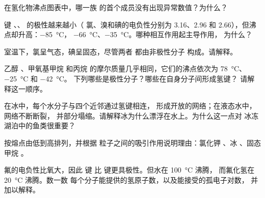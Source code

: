 \begin{exercise}[$\star\star$]\label{exo:g11:polarity-and-cohesion:9}
在氢化物沸点图表中，哪一族
的首个成员没有出现异常数值？为什么？
\end{exercise}

\begin{exercise}[$\star\star$]\label{exo:g11:polarity-and-cohesion:10}
键 、、 的极性越来越小（
氯、溴和碘的电负性分别为 3.16、2.96
和 2.66），但沸点却升高：\qty{-85}{\celsius}，
\qty{-66}{\celsius}、\qty{-35}{\celsius}。哪种相互作用起主导作用，
为什么？
\end{exercise}

\begin{exercise}[$\star\star$]\label{exo:g11:polarity-and-cohesion:11}
室温下，氯呈气态，碘呈固态，尽管两者
都由非极性分子  构成。请解释。
\end{exercise}

\begin{exercise}[$\star\star\star$]\label{exo:g11:polarity-and-cohesion:12}
乙醇 、甲氧基甲烷  和丙烷
 的摩尔质量几乎相同，它们的沸点依次为
\qty{78}{\celsius}、\qty{-25}{\celsius} 和 \qty{-42}{\celsius}。
下列哪些是极性分子？哪些在自身分子间形成氢键？
请解释这一顺序。
\end{exercise}

\begin{exercise}[$\star\star\star$]\label{exo:g11:polarity-and-cohesion:13}
在冰中，每个水分子与四个近邻通过氢键相连，
形成开放的网络；在液态水中，网络不断断裂，
并部分塌缩。请解释冰为什么漂浮在水上。为什么这一点对
冰冻湖泊中的鱼类很重要？
\end{exercise}

\begin{exercise}[$\star\star\star$]\label{exo:g11:polarity-and-cohesion:14}
按熔点由低到高排列，并根据
粒子之间的吸引作用说明理由：氯化钾 、冰
、固态甲烷 。
\end{exercise}

\begin{exercise}[$\star\star\star$]\label{exo:g11:polarity-and-cohesion:15}
氟的电负性比氧大，因此  键
比  键更具极性。但水在 \qty{100}{\celsius} 沸腾，
而氟化氢在 \qty{20}{\celsius} 沸腾。数一数
每个分子能提供的氢原子数，以及能接受的孤电子对数，
并加以解释。
\end{exercise}

